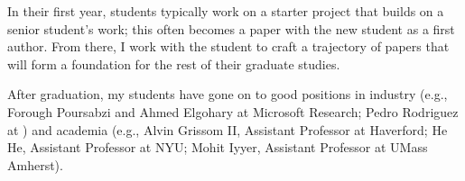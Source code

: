 In their first year, students typically work on a starter project that
builds on a senior student's work; this often becomes a paper with the
new student as a first author.  From there, I work with the student to
craft a trajectory of papers that will form a foundation for the rest
of their graduate studies.

After graduation, my students have gone on to good positions in
industry (e.g., Forough Poursabzi and Ahmed Elgohary at Microsoft
Research; Pedro Rodriguez at ) and academia (e.g., Alvin
Grissom II, Assistant Professor at Haverford; He He, Assistant
Professor at NYU; Mohit Iyyer, Assistant Professor at UMass Amherst).








